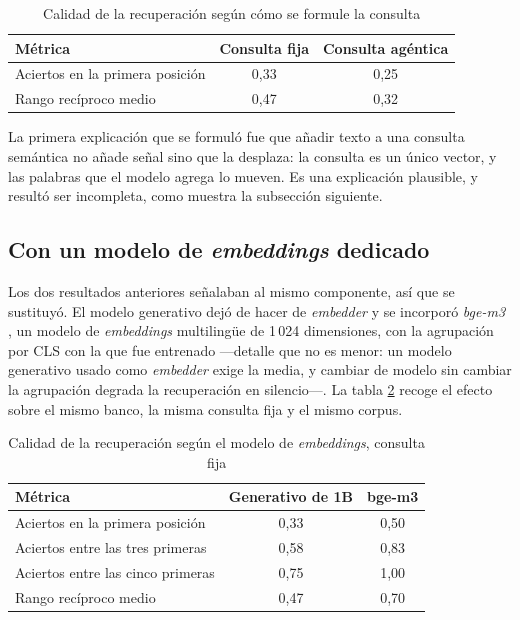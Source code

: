 \begin{table}[H]
  \centering
  \caption{Calidad de la recuperación según cómo se formule la consulta}
  \label{tab:consulta}
  \begin{tabular}{@{}lcc@{}}
    \toprule
    \textbf{Métrica} & \textbf{Consulta fija} & \textbf{Consulta agéntica} \\
    \midrule
    Aciertos en la primera posición & 0,33 & 0,25 \\
    Rango recíproco medio & 0,47 & 0,32 \\
    \bottomrule
  \end{tabular}
\end{table}

La primera explicación que se formuló fue que añadir texto a una consulta semántica no añade señal
sino que la desplaza: la consulta es un único vector, y las palabras que el modelo agrega lo mueven.
Es una explicación plausible, y resultó ser incompleta, como muestra la subsección siguiente.

\subsection{Con un modelo de \emph{embeddings} dedicado}

Los dos resultados anteriores señalaban al mismo componente, así que se sustituyó. El modelo
generativo dejó de hacer de \emph{embedder} y se incorporó \emph{bge-m3} \cite{chen2024bgem3}, un modelo de
\emph{embeddings} multilingüe de 1\,024 dimensiones, con la agrupación por CLS con la que fue
entrenado ---detalle que no es menor: un modelo generativo usado como \emph{embedder} exige la
media, y cambiar de modelo sin cambiar la agrupación degrada la recuperación en silencio---. La
tabla \ref{tab:bge} recoge el efecto sobre el mismo banco, la misma consulta fija y el mismo corpus.

\begin{table}[H]
  \centering
  \caption{Calidad de la recuperación según el modelo de \emph{embeddings}, consulta fija}
  \label{tab:bge}
  \begin{tabular}{@{}lcc@{}}
    \toprule
    \textbf{Métrica} & \textbf{Generativo de 1B} & \textbf{bge-m3} \\
    \midrule
    Aciertos en la primera posición & 0,33 & 0,50 \\
    Aciertos entre las tres primeras & 0,58 & 0,83 \\
    Aciertos entre las cinco primeras & 0,75 & 1,00 \\
    Rango recíproco medio & 0,47 & 0,70 \\
    \bottomrule
  \end{tabular}
\end{table}

